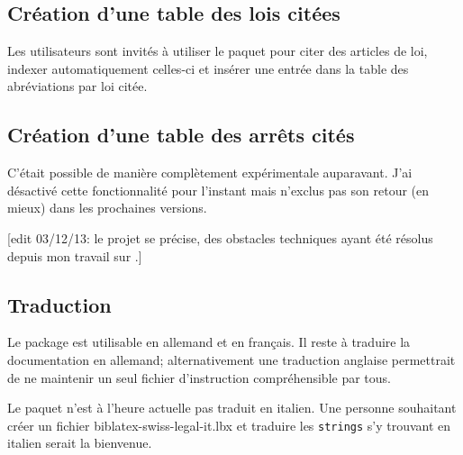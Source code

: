 \documentclass[a4paper]{ltxdockit}[2011/03/25]
\newcommand{\lxrf}{\sty{lexref}\xspace}
\newcommand{\GM}{\enquote}
\begin{document}
\subsection{Création d'une table des lois citées}

Les utilisateurs sont invités à utiliser le paquet \lxrf pour citer des articles de loi, indexer automatiquement celles-ci et insérer une entrée dans la table des abréviations par loi citée.

%
%

\subsection{Création d'une table des arrêts cités}

C'était possible de manière complètement expérimentale auparavant. J'ai désactivé cette fonctionnalité pour l'instant mais n'exclus pas son retour (en mieux) dans les prochaines versions.

[edit 03/12/13: le projet se précise, des obstacles techniques ayant été résolus depuis mon travail sur \lxrf.]

\subsection{Traduction}
\label{tradpackage}

Le package est utilisable en allemand et en français.
Il reste à traduire la documentation en allemand; alternativement une traduction anglaise permettrait de ne maintenir un seul fichier d'instruction compréhensible par tous.

Le paquet n'est à l'heure actuelle pas traduit en italien. Une personne souhaitant créer un fichier biblatex-swiss-legal-it.lbx et traduire les \verb/strings/ s'y trouvant en italien serait la bienvenue.
\end{document}
